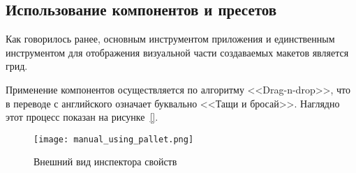 \subsection{Использование компонентов и пресетов}
\label{sec:manual:inspector_manual}

Как говорилось ранее, основным инструментом приложения и единственным инструментом для отображения визуальной части создаваемых макетов является грид.

Применение компонентов осуществляется по алгоритму <<Drag-n-drop>>, что в переводе с английского означает буквально <<Тащи и бросай>>. Наглядно этот процесс показан на рисунке~\ref{}.

\begin{figure}[ht]
\centering
    \texttt{[image: manual\_using\_pallet.png]}
    \caption{Внешний вид инспектора свойств}
    \label{sec:manual:manual_using_pallet}
\end{figure}
